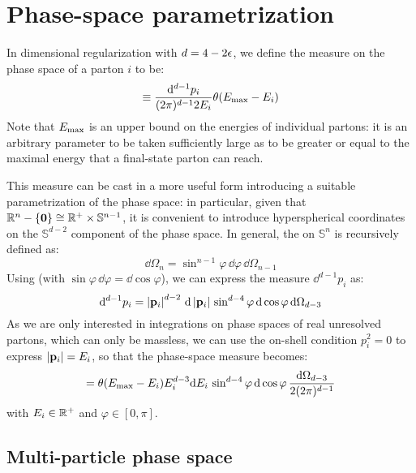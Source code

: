 
\section{Phase-space parametrization}
\label{sec:ph-sp-p}

In dimensional regularization with $ d = 4 - 2 \epsilon $, we define the measure on the phase space of a parton $ i $ to be:
\begin{equation}
  [\dd p_i] \equiv \frac{\dd^{d-1} p_i}{(2\pi)^{d-1} 2E_i} \theta(\ema - E_i)
\end{equation}
Note that $ E_\text{max} $ is an upper bound on the energies of individual partons: it is an arbitrary parameter to be taken sufficiently large as to be greater or equal to the maximal energy that a final-state parton can reach.

This measure can be cast in a more useful form introducing a suitable parametrization of the phase space: in particular, given that $ \mathbb{R}^n-\{\mathbf{0}\} \cong \mathbb{R}^+ \times \mathbb{S}^{n-1} $, it is convenient to introduce hyperspherical coordinates on the $ \mathbb{S}^{d-2} $ component of the phase space. In general, the  on $ \mathbb{S}^n $ is recursively defined as:
\begin{equation}
  \dd \Omega_n = \sin^{n-1} \varphi \, \dd \varphi \, \dd \Omega_{n-1}
  \label{eq:hyp-rec}
\end{equation}
Using  (with $ \sin \varphi \, \dd \varphi = \dd \cos \varphi $), we can express the measure $ \dd^{d-1} p_i $ as:
\begin{equation}
  \mathrm{d}^{d-1} p_i = \left\lvert\mathbf{p}_i\right\rvert^{d-2} \, \mathrm{d} \left\lvert\mathbf{p}_i\right\rvert \, \sin^{d-4} \varphi \, \mathrm{d} \cos \varphi \, \mathrm{d} \Omega_{d-3}
\end{equation}
As we are only interested in integrations on phase spaces of real unresolved partons, which can only be massless, we can use the on-shell condition $ p_i^2 = 0 $ to express $ \left\lvert\mathbf{p}_i\right\rvert = E_i $, so that the phase-space measure becomes:
\begin{equation}
  [\dd p_i] = \theta(\ema - E_i) E_i^{d-3} \dd E_i \, \sin^{d-4} \varphi \, \dd \cos \varphi \, \frac{\dd \Omega_{d-3}}{2(2\pi)^{d-1}}
\end{equation}
with $ E_i \in \mathbb{R}^+ $ and $ \varphi \in [0,\pi] $.

\subsection{Multi-particle phase space}

